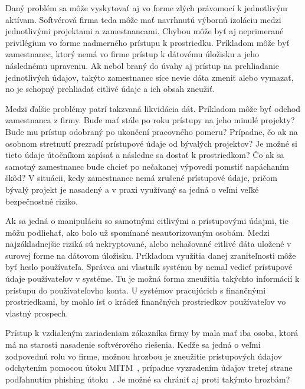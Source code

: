 Daný problém sa môže vyskytovať aj vo forme zlých právomocí k jednotlivým aktívam.
Softvérová firma teda môže mať navrhnutú výbornú izoláciu medzi jednotlivými projektami a zamestnancami.
Chybou môže byť aj neprimerané privilégium vo forme nadmerného prístupu k prostriedku.
Príkladom môže byť zamestnanec, ktorý nemá vo firme prístup k dátovému úložisku a jeho následnému upraveniu.
Ak nebol braný do úvahy aj prístup na prehliadanie jednotlivých údajov, takýto zamestnanec síce nevie dáta zmeniť alebo
vymazať, no je schopný prehliadať citlivé údaje a ich obsah zneužiť.

Medzi ďalšie problémy patrí takzvaná likvidácia dát.
Príkladom môže byť odchod zamestnanca z firmy.
Buďe mať stále po roku prístupy na jeho minulé projekty?
Bude mu prístup odobraný po ukončení pracovného pomeru?
Prípadne, čo ak na osobnom stretnutí prezradí prístupové údaje od bývalých projektov?
Je možné si tieto údaje útočníkom zapísať a následne sa dostať k prostriedkom?
Čo ak sa samotný zamestnanec bude chcieť po nečakanej výpovedi pomstiť napáchaním škôd?
V situácii, kedy zamestnanec nemá zrušené prístupové údaje, pričom bývalý projekt je nasadený a v praxi využívaný sa
jedná o veľmi veľké bezpečnostné riziko.

Ak sa jedná o manipuláciu so samotnými citlivými a prístupovými údajmi, tie môžu podliehať, ako bolo už spomínané neautorizovaným osobám.
Medzi najzákladnejšie riziká sú nekryptované, alebo nehašované citlivé dáta uložené v surovej forme na dátovom úložisku.
Príkladom využitia danej zraniteľnosti môže byť heslo používateľa.
Správca ani vlastník systému by nemal vedieť prístupové údaje používateľov v systéme.
Tu je možná forma zneužitia takýchto informácií k prístupu do používateľovho konta.
U systémov pracujúcich s finančnými prostriedkami, by mohlo ísť o krádež finančných prostriedkov používateľov vo vlastný prospech.

Prístup k vzdialeným zariadeniam zákazníka firmy by mala mať iba osoba, ktorá má na starosti nasadenie softvérového riešenia.
Keďže sa jedná o veľmi zodpovednú rolu vo firme, možnou hrozbou je zneužitie prístupových údajov odchytením pomocou útoku
MITM~\cite{MITM}, prípadne vyzradením údajov tretej strane podľahnutím phishing útoku~\cite{Phishing}.
Je možné sa chrániť aj proti takýmto hrozbám?

